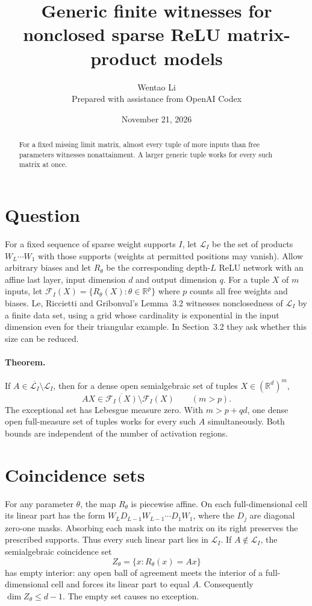 \documentclass[11pt]{article}
\title{Generic finite witnesses for nonclosed sparse ReLU matrix-product models}
\author{Wentao Li\\{\small Prepared with assistance from OpenAI Codex}}
\date{November 21, 2026}
\begin{document}
\maketitle
\begin{abstract}
For a fixed missing limit matrix, almost every tuple of more inputs than free parameters witnesses nonattainment. A larger generic tuple works for every such matrix at once.
\end{abstract}
\section*{Question}
For a fixed sequence of sparse weight supports $I$, let $\mathcal L_I$ be the set of products $W_L\cdots W_1$ with those supports (weights at permitted positions may vanish). Allow arbitrary biases and let $R_\theta$ be the corresponding depth-$L$ ReLU network with an affine last layer, input dimension $d$ and output dimension $q$. For a tuple $X$ of $m$ inputs, let $\mathcal F_I(X)=\{R_\theta(X):\theta\in\mathbb R^p\}$ where $p$ counts all free weights and biases. Le, Riccietti and Gribonval's Lemma~3.2 witnesses nonclosedness of $\mathcal L_I$ by a finite data set, using a grid whose cardinality is exponential in the input dimension even for their triangular example. In Section~3.2 they ask whether this size can be reduced.

\paragraph{Theorem.} If $A\in\overline{\mathcal L_I}\setminus\mathcal L_I$, then for a dense open semialgebraic set of tuples $X\in(\mathbb R^d)^m$,
\[
 AX\in\overline{\mathcal F_I(X)}\setminus\mathcal F_I(X)\qquad(m>p).
\]
The exceptional set has Lebesgue measure zero. With $m>p+qd$, one dense open full-measure set of tuples works for every such $A$ simultaneously. Both bounds are independent of the number of activation regions.

\section*{Coincidence sets}
For any parameter $\theta$, the map $R_\theta$ is piecewise affine. On each full-dimensional cell its linear part has the form $W_LD_{L-1}W_{L-1}\cdots D_1W_1$, where the $D_j$ are diagonal zero-one masks. Absorbing each mask into the matrix on its right preserves the prescribed supports. Thus every such linear part lies in $\mathcal L_I$. If $A\notin\mathcal L_I$, the semialgebraic coincidence set
\[
 Z_\theta=\{x:R_\theta(x)=Ax\}
\]
has empty interior: any open ball of agreement meets the interior of a full-dimensional cell and forces its linear part to equal $A$. Consequently $\dim Z_\theta\le d-1$. The empty set causes no exception.
\end{document}
